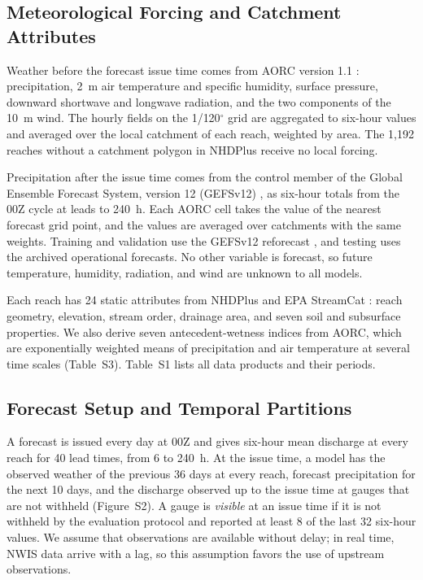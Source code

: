 \documentclass[draft]{agujournal2019}
\begin{document}
\subsection{Meteorological Forcing and Catchment Attributes}
\label{sec:inputs}
Weather before the forecast issue time comes from AORC version 1.1 \cite{Fall2023}: precipitation, 2~m air temperature and specific humidity, surface pressure, downward shortwave and longwave radiation, and the two components of the 10~m wind. The hourly fields on the 1/120$^\circ$ grid are aggregated to six-hour values and averaged over the local catchment of each reach, weighted by area. The 1,192 reaches without a catchment polygon in NHDPlus receive no local forcing.

Precipitation after the issue time comes from the control member of the Global Ensemble Forecast System, version 12 (GEFSv12) \cite{Zhou2022,Guan2022}, as six-hour totals from the 00Z cycle at leads to 240~h. Each AORC cell takes the value of the nearest forecast grid point, and the values are averaged over catchments with the same weights. Training and validation use the GEFSv12 reforecast \cite{Guan2022}, and testing uses the archived operational forecasts. No other variable is forecast, so future temperature, humidity, radiation, and wind are unknown to all models.

Each reach has 24 static attributes from NHDPlus and EPA StreamCat \cite{Hill2016}: reach geometry, elevation, stream order, drainage area, and seven soil and subsurface properties. We also derive seven antecedent-wetness indices from AORC, which are exponentially weighted means of precipitation and air temperature at several time scales (Table~S3). Table~S1 lists all data products and their periods.

\subsection{Forecast Setup and Temporal Partitions}
\label{sec:protocol}
A forecast is issued every day at 00Z and gives six-hour mean discharge at every reach for 40 lead times, from 6 to 240~h. At the issue time, a model has the observed weather of the previous 36 days at every reach, forecast precipitation for the next 10 days, and the discharge observed up to the issue time at gauges that are not withheld (Figure~S2). A gauge is \emph{visible} at an issue time if it is not withheld by the evaluation protocol and reported at least 8 of the last 32 six-hour values. We assume that observations are available without delay; in real time, NWIS data arrive with a lag, so this assumption favors the use of upstream observations.
\end{document}
